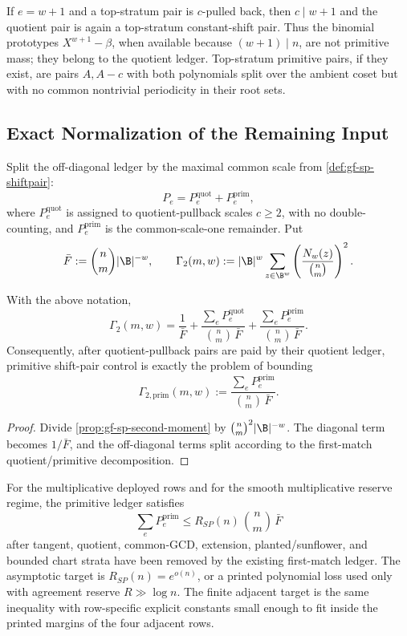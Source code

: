 \begin{remark}
\label{rem:gf-sp-top-pullback}
If \(e=w+1\) and a top-stratum pair is \(c\)-pulled back, then \(c\mid w+1\)
and the quotient pair is again a top-stratum constant-shift pair.  Thus the
binomial prototypes \(X^{w+1}-\beta\), when available because
\((w+1)\mid n\), are not primitive mass; they belong to the quotient ledger.
Top-stratum primitive pairs, if they exist, are pairs \(A,A-c\) with both
polynomials split over the ambient coset but with no common nontrivial
periodicity in their root sets.
\end{remark}

\subsection{Exact Normalization of the Remaining Input}

Split the off-diagonal ledger by the maximal common scale from
\cref{def:gf-sp-shiftpair}:
\[
        P_e=P_e^{\mathrm{quot}}+P_e^{\mathrm{prim}},
\]
where \(P_e^{\mathrm{quot}}\) is assigned to quotient-pullback scales
\(c\ge2\), with no double-counting, and \(P_e^{\mathrm{prim}}\) is the
common-scale-one remainder.  Put
\[
        \bar F:=\binom{n}{m}|\B|^{-w},
        \qquad
        \Gamma_2(m,w):=|\B|^w\sum_{z\in\B^w}
        \left(\frac{N_w(z)}{\binom nm}\right)^2 .
\]

\begin{proposition}
\label{prop:gf-sp-gamma2}
With the above notation,
\[
        \Gamma_2(m,w)
        =
        \frac1{\bar F}
        +\frac{\sum_e P_e^{\mathrm{quot}}}{\binom nm\,\bar F}
        +\frac{\sum_e P_e^{\mathrm{prim}}}{\binom nm\,\bar F}.
\]
Consequently, after quotient-pullback pairs are paid by their quotient ledger,
primitive shift-pair control is exactly the problem of bounding
\[
        \Gamma_{2,\mathrm{prim}}(m,w):=
        \frac{\sum_e P_e^{\mathrm{prim}}}{\binom nm\,\bar F}.
\]
\end{proposition}

\begin{proof}
Divide \cref{prop:gf-sp-second-moment} by \(\binom nm^2|\B|^{-w}\).  The
diagonal term becomes \(1/\bar F\), and the off-diagonal terms split according
to the first-match quotient/primitive decomposition.
\end{proof}

\begin{conjecture}
\label{conj:gf-sp-primitive-ledger}
For the multiplicative deployed rows and for the smooth multiplicative reserve
regime, the primitive ledger satisfies
\[
        \sum_e P_e^{\mathrm{prim}}
        \le
        R_{SP}(n)\,\binom nm\,\bar F
\]
after tangent, quotient, common-GCD, extension, planted/sunflower, and bounded
chart strata have been removed by the existing first-match ledger.  The
asymptotic target is \(R_{SP}(n)=e^{o(n)}\), or a printed polynomial loss used
only with agreement reserve \(R\gg\log n\).  The finite adjacent target is the
same inequality with row-specific explicit constants small enough to fit inside
the printed margins of the four adjacent rows.
\end{conjecture}

